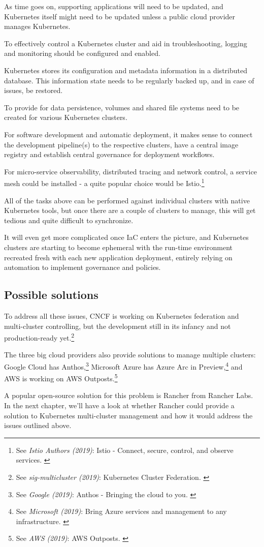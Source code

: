 As time goes on, supporting applications will need to be updated, and Kubernetes itself might need to be updated unless a public cloud provider manages Kubernetes.

To effectively control a Kubernetes cluster and aid in troubleshooting, logging and monitoring should be configured and enabled.

Kubernetes stores its configuration and metadata information in a distributed database. This information state needs to be regularly backed up, and in case of issues, be restored.

To provide for data persistence, volumes and shared file systems need to be created for various Kubernetes clusters.

For software development and automatic deployment, it makes sense to connect the development pipeline(s) to the respective clusters, have a central image registry and establish central governance for deployment workflows.

For micro-service observability, distributed tracing and network control, a service mesh could be installed - a quite popular choice would be Istio.\footnote{See \textit{Istio Authors (2019)}: Istio - Connect, secure, control, and observe services. \cite{istio}}

All of the tasks above can be performed against individual clusters with native Kubernetes tools, but once there are a couple of clusters to manage, this will get tedious and quite difficult to synchronize.

It will even get more complicated once IaC enters the picture, and Kubernetes clusters are starting to become ephemeral with the run-time environment recreated fresh with each new application deployment, entirely relying on automation to implement governance and policies.

\subsection{Possible solutions}

To address all these issues, CNCF is working on Kubernetes federation and multi-cluster controlling, but the development still in its infancy and not production-ready yet.\footnote{See \textit{sig-multicluster (2019)}: Kubernetes Cluster Federation. \cite{kubeFed}}

The three big cloud providers also provide solutions to manage multiple clusters: Google Cloud has Anthos,\footnote{See \textit{Google (2019)}: Anthos - Bringing the cloud to you. \cite{googleAnthos}} Microsoft Azure has Azure Arc in Preview,\footnote{See \textit{Microsoft (2019)}: Bring Azure services and management to any infrastructure. \cite{azureArc}} and AWS is working on AWS Outposts.\footnote{See \textit{AWS (2019)}: AWS Outposts. \cite{awsOutposts}}

A popular open-source solution for this problem is Rancher from Rancher Labs. In the next chapter, we'll have a look at whether Rancher could provide a solution to Kubernetes multi-cluster management and how it would address the issues outlined above.
